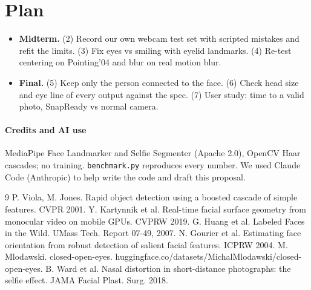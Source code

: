 \documentclass[11pt]{article}
\begin{document}
\section{Plan}
\begin{itemize}
    \setlength{\itemsep}{0pt}
    \item \textbf{Midterm.} (2) Record our own webcam test set with scripted mistakes and refit the limits. (3) Fix eyes vs smiling with eyelid landmarks. (4) Re-test centering on Pointing'04 and blur on real motion blur.
    \item \textbf{Final.} (5) Keep only the person connected to the face. (6) Check head size and eye line of every output against the spec. (7) User study: time to a valid photo, SnapReady vs normal camera.
\end{itemize}

\paragraph{Credits and AI use} MediaPipe Face Landmarker and Selfie Segmenter (Apache 2.0), OpenCV Haar cascades; no training. \texttt{benchmark.py} reproduces every number. We used Claude Code (Anthropic) to help write the code and draft this proposal.

{\footnotesize
\begin{thebibliography}{9}
\setlength{\itemsep}{0pt}
 P. Viola, M. Jones. Rapid object detection using a boosted cascade of simple features. CVPR 2001.
 Y. Kartynnik et al. Real-time facial surface geometry from monocular video on mobile GPUs. CVPRW 2019.
 G. Huang et al. Labeled Faces in the Wild. UMass Tech. Report 07-49, 2007.
 N. Gourier et al. Estimating face orientation from robust detection of salient facial features. ICPRW 2004.
 M. Mlodawski. closed-open-eyes. huggingface.co/datasets/MichalMlodawski/closed-open-eyes.
 B. Ward et al. Nasal distortion in short-distance photographs: the selfie effect. JAMA Facial Plast. Surg. 2018.
\end{thebibliography}}
\end{document}
